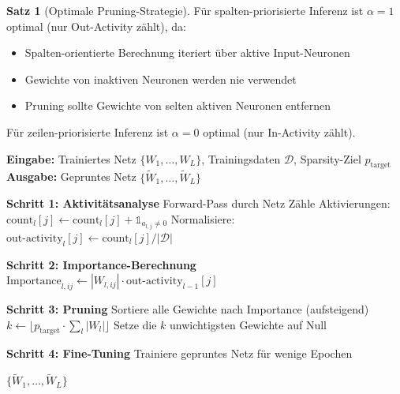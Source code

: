 ﻿\documentclass[a4paper,12pt]{report}
\theoremstyle{definition}
\newtheorem{satz}{Satz}
\begin{document}
	\begin{satz}[Optimale Pruning-Strategie]
		Für spalten-priorisierte Inferenz ist $\alpha = 1$ optimal (nur Out-Activity zählt), da:
		\begin{itemize}
			\item Spalten-orientierte Berechnung iteriert über aktive Input-Neuronen
			\item Gewichte von inaktiven Neuronen werden nie verwendet
			\item Pruning sollte Gewichte von selten aktiven Neuronen entfernen
		\end{itemize}
		
		Für zeilen-priorisierte Inferenz ist $\alpha = 0$ optimal (nur In-Activity zählt).
	\end{satz}
	
	\begin{algorithm}[H]
		\caption{Asymmetrie-bewusstes Structured Pruning}
		\label{alg:asymmetry-aware-pruning}
		\textbf{Eingabe:} Trainiertes Netz $\{W_1, \ldots, W_L\}$, Trainingsdaten $\mathcal{D}$, Sparsity-Ziel $p_{\text{target}}$ \\
		\textbf{Ausgabe:} Gepruntes Netz $\{\tilde{W}_1, \ldots, \tilde{W}_L\}$
		\begin{algorithmic}[1]
			\State \textbf{Schritt 1: Aktivitätsanalyse}
			\State Forward-Pass durch Netz
			\State Zähle Aktivierungen: $\text{count}_l[j] \gets \text{count}_l[j] + \mathbb{1}_{a_{l,j} \neq 0}$
			\EndFor
			\EndFor
			\State Normalisiere: $\text{out-activity}_l[j] \gets \text{count}_l[j] / |\mathcal{D}|$
			
			\State \textbf{Schritt 2: Importance-Berechnung}
			\State $\text{Importance}_{l,ij} \gets |W_{l,ij}| \cdot \text{out-activity}_{l-1}[j]$
			\EndFor
			\EndFor
			
			\State \textbf{Schritt 3: Pruning}
			\State Sortiere alle Gewichte nach Importance (aufsteigend)
			\State $k \gets \lfloor p_{\text{target}} \cdot \sum_l |W_l| \rfloor$
			\State Setze die $k$ unwichtigsten Gewichte auf Null
			
			\State \textbf{Schritt 4: Fine-Tuning}
			\State Trainiere gepruntes Netz für wenige Epochen
			
			\State \Return $\{\tilde{W}_1, \ldots, \tilde{W}_L\}$
		\end{algorithmic}
	\end{algorithm}
	
\end{document}
